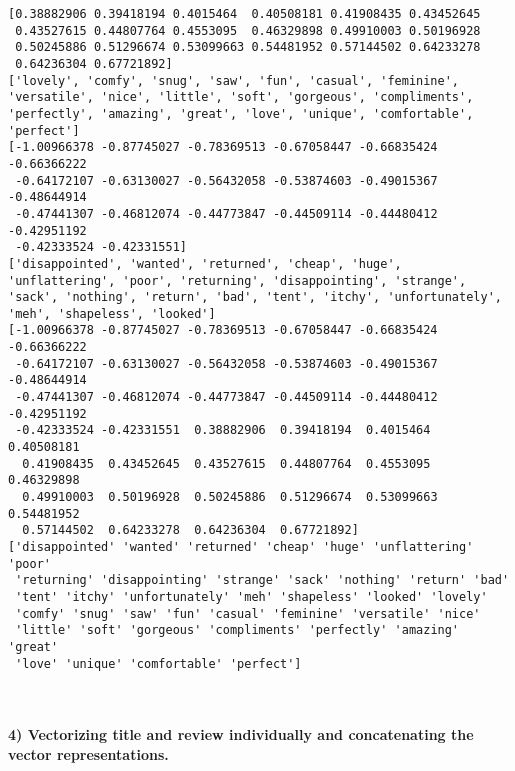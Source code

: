 \documentclass[11pt]{article}
\begin{document}
    \begin{Verbatim}[commandchars=\\\{\}]
[0.38882906 0.39418194 0.4015464  0.40508181 0.41908435 0.43452645
 0.43527615 0.44807764 0.4553095  0.46329898 0.49910003 0.50196928
 0.50245886 0.51296674 0.53099663 0.54481952 0.57144502 0.64233278
 0.64236304 0.67721892]
['lovely', 'comfy', 'snug', 'saw', 'fun', 'casual', 'feminine', 'versatile', 'nice', 'little', 'soft', 'gorgeous', 'compliments', 'perfectly', 'amazing', 'great', 'love', 'unique', 'comfortable', 'perfect']
[-1.00966378 -0.87745027 -0.78369513 -0.67058447 -0.66835424 -0.66366222
 -0.64172107 -0.63130027 -0.56432058 -0.53874603 -0.49015367 -0.48644914
 -0.47441307 -0.46812074 -0.44773847 -0.44509114 -0.44480412 -0.42951192
 -0.42333524 -0.42331551]
['disappointed', 'wanted', 'returned', 'cheap', 'huge', 'unflattering', 'poor', 'returning', 'disappointing', 'strange', 'sack', 'nothing', 'return', 'bad', 'tent', 'itchy', 'unfortunately', 'meh', 'shapeless', 'looked']
[-1.00966378 -0.87745027 -0.78369513 -0.67058447 -0.66835424 -0.66366222
 -0.64172107 -0.63130027 -0.56432058 -0.53874603 -0.49015367 -0.48644914
 -0.47441307 -0.46812074 -0.44773847 -0.44509114 -0.44480412 -0.42951192
 -0.42333524 -0.42331551  0.38882906  0.39418194  0.4015464   0.40508181
  0.41908435  0.43452645  0.43527615  0.44807764  0.4553095   0.46329898
  0.49910003  0.50196928  0.50245886  0.51296674  0.53099663  0.54481952
  0.57144502  0.64233278  0.64236304  0.67721892]
['disappointed' 'wanted' 'returned' 'cheap' 'huge' 'unflattering' 'poor'
 'returning' 'disappointing' 'strange' 'sack' 'nothing' 'return' 'bad'
 'tent' 'itchy' 'unfortunately' 'meh' 'shapeless' 'looked' 'lovely'
 'comfy' 'snug' 'saw' 'fun' 'casual' 'feminine' 'versatile' 'nice'
 'little' 'soft' 'gorgeous' 'compliments' 'perfectly' 'amazing' 'great'
 'love' 'unique' 'comfortable' 'perfect']

    \end{Verbatim}

    \begin{center}
    \end{center}
    { \hspace*{\fill} \\}
    
    \paragraph{4) Vectorizing title and review individually and
concatenating the vector
representations.}\label{vectorizing-title-and-review-individually-and-concatenating-the-vector-representations.}
\end{document}
